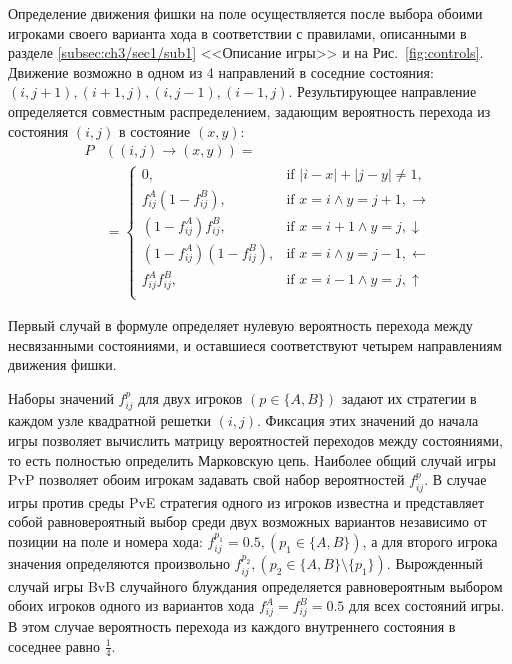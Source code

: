 Определение движения фишки на поле осуществляется после выбора обоими игроками своего варианта хода в соответствии с правилами,
описанными в разделе \cref{subsec:ch3/sec1/sub1} <<Описание игры>> и на Рис.~\cref{fig:controls}. 
Движение возможно в одном из 4 направлений в соседние состояния:
$(i, j + 1), (i + 1, j), (i, j - 1), (i - 1, j)$. Результирующее направление определяется совместным распределением, 
задающим вероятность перехода из состояния $(i, j)$ в состояние $(x, y)$:
\begin{equation}
    \begin{aligned}
    P& \left( (i, j) \rightarrow (x, y) \right) = \\
    &=\begin{cases}
        0, &\mbox{if } |i-x|+|j-y| \neq 1,\\ 
        f_{ij}^A \left(1-f_{ij}^B\right), &\mbox{if } x=i \land y=j+1, \boldsymbol{\rightarrow}\\
        \left(1-f_{ij}^A\right) f_{ij}^B, &\mbox{if } x=i+1 \land y=j, \boldsymbol{\downarrow}\\
        \left(1-f_{ij}^A\right) \left(1-f_{ij}^B\right), &\mbox{if } x=i \land y=j-1, \boldsymbol{\leftarrow}\\
        f_{ij}^A f_{ij}^B, &\mbox{if } x=i-1 \land y=j, \boldsymbol{\uparrow}\\
    \end{cases}
    \label{eq:transition}
    \end{aligned}
\end{equation}

Первый случай в формуле определяет нулевую вероятность перехода между несвязанными состояниями, и оставшиеся соответствуют четырем направлениям движения фишки.

Наборы значений $f_{ij}^p$ для двух игроков $(p \in \{A, B\})$ задают их стратегии в каждом узле квадратной решетки $(i, j)$. 
Фиксация этих значений до начала игры позволяет вычислить матрицу вероятностей переходов между состояниями, то есть полностью определить Марковскую цепь.
Наиболее общий случай игры PvP позволяет обоим игрокам задавать свой набор вероятностей $f_{ij}^p$. В случае игры против среды PvE
стратегия одного из игроков известна и представляет собой равновероятный выбор среди двух возможных вариантов независимо от позиции на поле и номера хода: $f_{ij}^{p_1} = 0.5, (p_1 \in \{A, B\})$, а для второго игрока значения определяются произвольно $f_{ij}^{p_2}, (p_2 \in \{A, B\} \setminus \{p_1\})$. 
Вырожденный случай игры BvB случайного блуждания определяется равновероятным выбором обоих игроков одного из вариантов хода $f_{ij}^{A} = f_{ij}^{B} = 0.5$
для всех состояний игры. В этом случае вероятность перехода из каждого внутреннего состояния в соседнее равно $\frac{1}{4}$.

